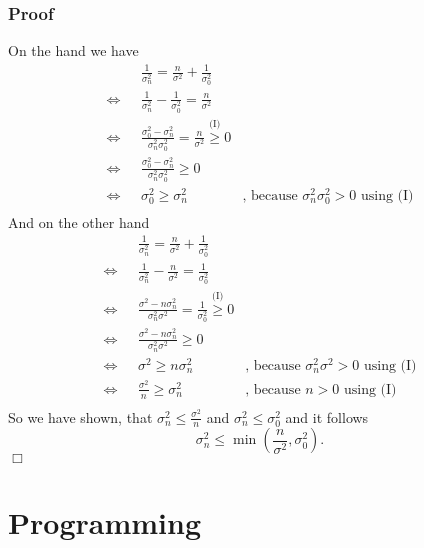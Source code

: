 \documentclass{article}
\begin{document}
\subsubsection*{Proof}
On the hand we have
\begin{align*}
				   &\frac{1}{\sigma^2_n} = \frac{n}{\sigma^2} + \frac{1}{\sigma^2_0}&\\
\Leftrightarrow ~~~&\frac{1}{\sigma^2_n} - \frac{1}{\sigma^2_0} = \frac{n}{\sigma^2}&\\
\Leftrightarrow ~~~&\frac{\sigma^2_0 - \sigma^2_n}{\sigma^2_n\sigma^2_0} = \frac{n}{\sigma^2} \stackrel{\text{(I)}}{\geq} 0&\\
\Leftrightarrow ~~~&\frac{\sigma^2_0 - \sigma^2_n}{\sigma^2_n\sigma^2_0} \geq 0&\\
\Leftrightarrow ~~~&\sigma^2_0 \geq \sigma^2_n& \text{, because } \sigma^2_n\sigma^2_0 > 0 \text{ using (I)}\\
\end{align*}
And on the other hand
\begin{align*}
				   &\frac{1}{\sigma^2_n} = \frac{n}{\sigma^2} + \frac{1}{\sigma^2_0}&\\
\Leftrightarrow ~~~&\frac{1}{\sigma^2_n} - \frac{n}{\sigma^2} = \frac{1}{\sigma^2_0}&\\
\Leftrightarrow ~~~&\frac{\sigma^2 - n\sigma^2_n}{\sigma^2_n\sigma^2} = \frac{1}{\sigma^2_0} \stackrel{\text{(I)}}{\geq} 0&\\
\Leftrightarrow ~~~&\frac{\sigma^2 - n\sigma^2_n}{\sigma^2_n\sigma^2} \geq 0&\\
\Leftrightarrow ~~~&\sigma^2 \geq n\sigma^2_n& \text{, because } \sigma^2_n\sigma^2 > 0 \text{ using (I)}\\
\Leftrightarrow ~~~&\frac{\sigma^2}{n} \geq \sigma^2_n& \text{, because } n > 0 \text{ using (I)}~~~~~\\
\end{align*}
So we have shown, that $\sigma^2_n \leq \frac{\sigma^2}{n}$ and $\sigma^2_n \leq \sigma^2_0$ and it follows
$$
\sigma^2_n \leq \min \left (\frac{n}{\sigma^2},\sigma^2_0 \right ).
$$
\hspace*{\fill}$\Box$
\section{Programming}


%

%

\end{document}
